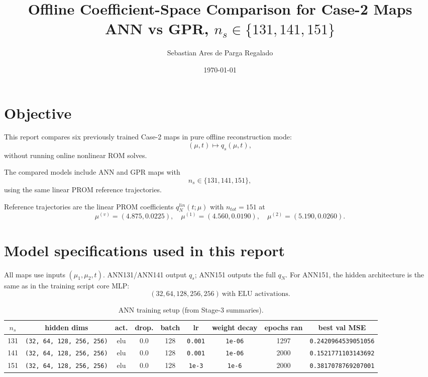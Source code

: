 \documentclass[11pt]{article}
\title{Offline Coefficient-Space Comparison for Case-2 Maps\\ANN vs GPR, $n_s\in\{131,141,151\}$}
\author{Sebastian Ares de Parga Regalado}
\date{\today}
\begin{document}
\maketitle

\section*{Objective}
This report compares six previously trained Case-2 maps in pure offline reconstruction mode:
\[
(\mu,t)\mapsto q_s(\mu,t),
\]
without running online nonlinear ROM solves.

The compared models include ANN and GPR maps with
\[
n_s\in\{131,141,151\},
\]
using the same linear PROM reference trajectories.

Reference trajectories are the linear PROM coefficients $q_N^{lin}(t;\mu)$ with $n_{tot}=151$ at
\[
\mu^{(v)}=(4.875,0.0225),\quad
\mu^{(1)}=(4.560,0.0190),\quad
\mu^{(2)}=(5.190,0.0260).
\]


\section*{Model specifications used in this report}
All maps use inputs $(\mu_1,\mu_2,t)$. ANN131/ANN141 output $q_s$; ANN151 outputs the full $q_N$.
For ANN151, the hidden architecture is the same as in the training script core MLP:
\[
(32,64,128,256,256)\ \text{with ELU activations}.
\]

\begin{table}[H]
\centering
\caption{ANN training setup (from Stage-3 summaries).}
\scriptsize
\begin{tabular}{ccccccccc}
\toprule
$n_s$ & hidden dims & act. & drop. & batch & lr & weight decay & epochs ran & best val MSE \\
\midrule
131 & \texttt{(32, 64, 128, 256, 256)} & elu & 0.0 & 128 & \texttt{0.001} & \texttt{1e-06} & 1297 & \texttt{0.2420964539051056} \\
141 & \texttt{(32, 64, 128, 256, 256)} & elu & 0.0 & 128 & \texttt{0.001} & \texttt{1e-06} & 2000 & \texttt{0.1521771103143692} \\
151 & \texttt{(32, 64, 128, 256, 256)} & elu & 0.0 & 128 & \texttt{1e-3} & \texttt{1e-6} & 2000 & \texttt{0.3817078769207001} \\
\bottomrule
\end{tabular}
\end{table}
\end{document}
